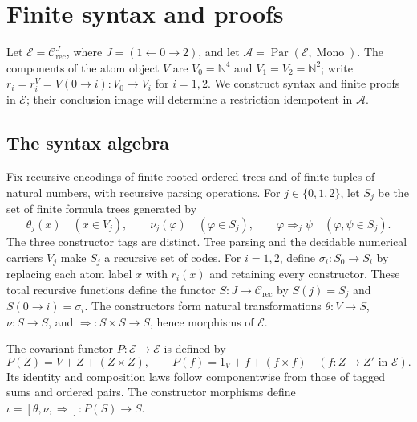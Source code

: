 \documentclass[11pt]{article}
\newcommand{\N}{\mathbb N}
\begin{document}
\section{Finite syntax and proofs}
\label{app:fork-proofs}

Let $\mathcal E=\mathcal C_{\mathrm{rec}}^{J}$, where
$J=(1\leftarrow0\to2)$, and let
$\mathcal A=\operatorname{Par}(\mathcal E,\operatorname{Mono})$.
The components of the atom object $V$ are $V_0=\N^4$ and
$V_1=V_2=\N^2$; write $r_i=r_i^V=V(0\to i):V_0\to V_i$
for $i=1,2$.
We construct syntax and finite proofs in $\mathcal E$; their
conclusion image will determine a restriction idempotent in $\mathcal A$.

\subsection{The syntax algebra}

Fix recursive encodings of finite rooted ordered trees and of finite
tuples of natural numbers, with recursive parsing operations. For
$j\in\{0,1,2\}$, let $S_j$ be the set of finite formula trees
generated by
\[
 \theta_j(x)\quad(x\in V_j),\qquad
 \nu_j(\varphi)\quad(\varphi\in S_j),\qquad
 \varphi\Rightarrow_j\psi\quad(\varphi,\psi\in S_j).
\]
The three constructor tags are distinct. Tree parsing and the
decidable numerical carriers $V_j$ make $S_j$ a recursive set of
codes. For $i=1,2$, define $\sigma_i:S_0\to S_i$ by replacing
each atom label $x$ with $r_i(x)$ and retaining every constructor.
These total recursive functions define the functor
$S:J\to\mathcal C_{\mathrm{rec}}$ by $S(j)=S_j$ and
$S(0\to i)=\sigma_i$. The constructors form natural transformations
$\theta:V\to S$, $\nu:S\to S$, and
$\Rightarrow:S\times S\to S$, hence morphisms of $\mathcal E$.

The covariant functor $P:\mathcal E\to\mathcal E$ is defined by
\[
 P(Z)=V+Z+(Z\times Z),\qquad
 P(f)=1_V+f+(f\times f)
 \quad(f:Z\to Z'\text{ in }\mathcal E).
\]
Its identity and composition laws follow componentwise from those
of tagged sums and ordered pairs. The constructor morphisms define
$\iota=[\theta,\nu,\Rightarrow]:P(S)\to S$.
\end{document}
